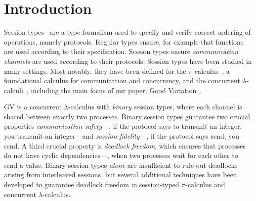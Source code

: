 \section{Introduction}
Session types~\cite{honda93,takeuchihonda94,hondavasconcelos98} are a type formalism used to specify and verify correct ordering of operations, namely protocols. Regular types ensure, for example that functions are used according to their specification. Session types ensure \emph{communication channels} are used according to their protocols. Session types have been studied in many settings. Most notably, they have been defined for the $\pi$-calculus~\cite{honda93,takeuchihonda94,hondavasconcelos98}, a foundational calculus for communication and concurrency, and the concurrent $\lambda$-calculi~\cite{gayvasconcelos10}, including the main focus of our paper: Good Variation~\cite[GV]{wadler15,lindleymorris15}.

GV is a concurrent $\lambda$-calculus with \emph{binary} session types, where each channel is shared between exactly two processes. Binary session types guarantee two crucial properties \emph{communication safety}---\eg, if the protocol says to transmit an integer, you transmit an integer---and \emph{session fidelity}---\eg, if the protocol says send, you send. A third crucial property is \emph{deadlock freedom}, which ensures that processes do not have cyclic dependencies---\eg, when two processes wait for each other to send a value. Binary session types \emph{alone} are insufficient to rule out deadlocks arising from interleaved sessions, but several additional techniques have been developed to guarantee deadlock freedom in session-typed $\pi$-calculus and concurrent $\lambda$-calculus.

